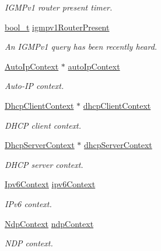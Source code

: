 \begin{DoxyCompactItemize}
\begin{DoxyCompactList}\small\item\em I\+G\+M\+Pv1 router present timer. \end{DoxyCompactList}\item 
\hyperlink{compiler__port_8h_a812d16e5494522586b3784e55d479912}{bool\+\_\+t} \hyperlink{struct__NetInterface_a32275d3c857019288295ba717c08178e}{igmpv1\+Router\+Present}
\begin{DoxyCompactList}\small\item\em An I\+G\+M\+Pv1 query has been recently heard. \end{DoxyCompactList}\item 
\hyperlink{auto__ip_8h_aa1164cc1ba77c262d41deb99cb704cc2}{Auto\+Ip\+Context} $\ast$ \hyperlink{struct__NetInterface_a706b2cf07ad2d4256984d454e6e4bb45}{auto\+Ip\+Context}
\begin{DoxyCompactList}\small\item\em Auto-\/\+IP context. \end{DoxyCompactList}\item 
\hyperlink{dhcp__client_8h_aa593bac3e82a5a4f433a169cb8abd8d9}{Dhcp\+Client\+Context} $\ast$ \hyperlink{struct__NetInterface_a77506d7bf0892b26346603e799e8b2b9}{dhcp\+Client\+Context}
\begin{DoxyCompactList}\small\item\em D\+H\+CP client context. \end{DoxyCompactList}\item 
\hyperlink{structDhcpServerContext}{Dhcp\+Server\+Context} $\ast$ \hyperlink{struct__NetInterface_aed4d56cf8a6426e709913bd4cbfbf138}{dhcp\+Server\+Context}
\begin{DoxyCompactList}\small\item\em D\+H\+CP server context. \end{DoxyCompactList}\item 
\hyperlink{structIpv6Context}{Ipv6\+Context} \hyperlink{struct__NetInterface_adec5cea8de75f6b862bf481ff162e566}{ipv6\+Context}
\begin{DoxyCompactList}\small\item\em I\+Pv6 context. \end{DoxyCompactList}\item 
\hyperlink{structNdpContext}{Ndp\+Context} \hyperlink{struct__NetInterface_a7a40b9513e795c73a7e3a8e6765fe6fc}{ndp\+Context}
\begin{DoxyCompactList}\small\item\em N\+DP context. \end{DoxyCompactList}\item 

\end{DoxyCompactItemize}
